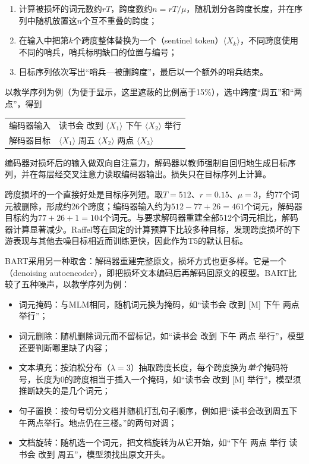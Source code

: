\begin{enumerate}
  \item 计算被损坏的词元数约$rT$，跨度数约$n=rT/\mu$，随机划分各跨度长度，并在序列中随机放置这$n$个互不重叠的跨度；
  \item 在输入中把第$k$个跨度整体替换为一个（sentinel token）$\langle X_k\rangle$，不同跨度使用不同的哨兵，哨兵标明缺口的位置与编号；
  \item 目标序列依次写出“哨兵—被删跨度”，最后以一个额外的哨兵结束。
\end{enumerate}

以教学序列为例（为便于显示，这里遮蔽的比例高于15\%），选中跨度“周五”和“两点”，得到
\begin{center}
 \begin{tabular}{@{}ll@{}}
  \toprule
  编码器输入 & 读书会 改到 $\langle X_1\rangle$ 下午 $\langle X_2\rangle$ 举行\\
  解码器目标 & $\langle X_1\rangle$ 周五 $\langle X_2\rangle$ 两点 $\langle X_3\rangle$\\
  \bottomrule
 \end{tabular}
\end{center}
编码器对损坏后的输入做双向自注意力，解码器以教师强制自回归地生成目标序列，并在每层经交叉注意力读取编码器输出。损失只在目标序列上计算。

跨度损坏的一个直接好处是目标序列短。取$T=512$、$r=0.15$、$\mu=3$，约77个词元被删除，形成约26个跨度；编码器输入约为$512-77+26=461$个词元，解码器目标约为$77+26+1=104$个词元。与要求解码器重建全部512个词元相比，解码器计算显著减少。Raffel等在固定的计算预算下比较多种目标，发现跨度损坏的下游表现与其他去噪目标相近而训练更快，因此作为T5的默认目标。

BART采用另一种取舍：解码器重建完整原文，损坏方式也更多样。它是一个（denoising autoencoder），即把损坏文本编码后再解码回原文的模型。BART比较了五种噪声，以教学序列为例：

\begin{itemize}
  \item 词元掩码：与MLM相同，随机词元换为掩码，如“读书会 改到 [M] 下午 两点 举行”；
  \item 词元删除：随机删除词元而不留标记，如“读书会 改到 下午 两点 举行”，模型还要判断哪里缺了内容；
  \item 文本填充：按泊松分布（$\lambda=3$）抽取跨度长度，每个跨度换为\emph{单个}掩码符号，长度为0的跨度相当于插入一个掩码，如“读书会 改到 [M] 举行”，模型须推断缺失的是几个词元；
  \item 句子置换：按句号切分文档并随机打乱句子顺序，例如把“读书会改到周五下午两点举行。地点仍在三楼。”的两句对调；
  \item 文档旋转：随机选一个词元，把文档旋转为从它开始，如“下午 两点 举行 读书会 改到 周五”，模型须找出原文开头。
\end{itemize}

